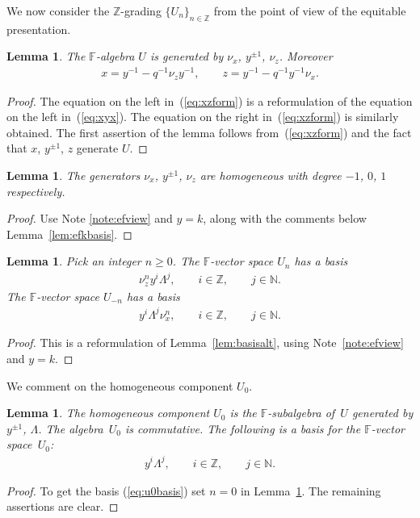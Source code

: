 \documentclass[pdftex]{sigma}
\numberwithin{equation}{section}
\newtheorem{Lemma}[Theorem]{Lemma}
\begin{document}
 We now consider the $\mathbb Z$-grading
$\lbrace U_n\rbrace_{n\in \mathbb Z}$ from the point
of view of the equitable presentation.


\begin{Lemma}
\label{lem:gensetu}
The $\mathbb F$-algebra $U$ is generated by
$\nu_x$, $y^{\pm 1}$, $\nu_z$. Moreover
\begin{gather}
x = y^{-1}- q^{-1}\nu_z y^{-1},
\qquad
z = y^{-1}- q^{-1}y^{-1} \nu_x.
\label{eq:xzform}
\end{gather}
\end{Lemma}

\begin{proof}
The equation
on the left
in~(\ref{eq:xzform})
is a reformulation of
the equation on the left
in~(\ref{eq:xyx}).
The equation on the right in~(\ref{eq:xzform}) is similarly obtained.
The f\/irst assertion of the lemma follows
from~(\ref{eq:xzform}) and the fact that
$x$, $y^{\pm 1}$, $z$ generate
$U$.
\end{proof}


\begin{Lemma}
\label{lem:weightlist}
The generators
$\nu_x$, $y^{\pm 1}$, $\nu_z$ are homogeneous
with degree $-1$, $0$, $1$ respectively.
\end{Lemma}
\begin{proof}
Use Note
\ref{note:efview} and $y=k$, along with
 the comments below
Lemma~\ref{lem:efkbasis}.
\end{proof}

\begin{Lemma}
\label{lem:unbasis}
Pick an integer $n\geq 0$.
The $\mathbb F$-vector space $U_n$ has a basis
\begin{gather*}
\nu^n_z  y^i \Lambda^j,
  \qquad i\in \mathbb Z, \qquad j\in \mathbb N.
\end{gather*}
The $\mathbb F$-vector space $U_{-n}$ has a basis
\begin{gather*}
y^i \Lambda^j \nu^n_x,
 \qquad i\in \mathbb Z, \qquad j\in \mathbb N.
\end{gather*}
\end{Lemma}
\begin{proof}
This is a reformulation of
Lemma~\ref{lem:basisalt}, using
Note~\ref{note:efview} and $y=k$.
\end{proof}


 We comment on the homogeneous component
$U_0$.

\begin{Lemma}
\label{lem:u0facts}
The homogeneous component
$U_0$ is the $\mathbb F$-subalgebra
of~$U$ generated by
$y^{\pm 1}$,
$\Lambda $.
The algebra~$U_0$
is commutative.
The following is a basis for the
$\mathbb F$-vector space~$U_0$:
\begin{gather}
\label{eq:u0basis}
 y^i \Lambda^j,
  \qquad i\in \mathbb Z, \qquad    j\in \mathbb N.
\end{gather}
\end{Lemma}
\begin{proof}
To get the basis
(\ref{eq:u0basis}) set $n=0$ in
Lemma~\ref{lem:unbasis}. The remaining assertions
are clear.
\end{proof}
\end{document}

